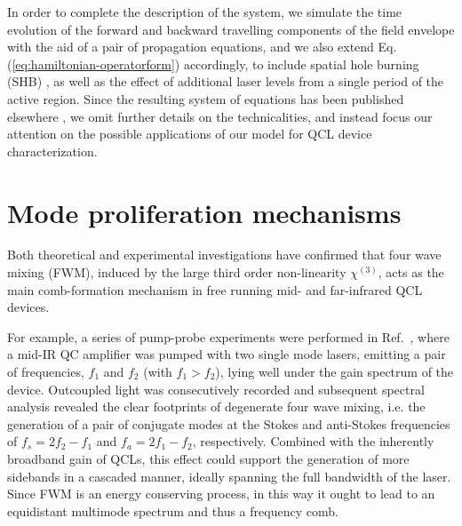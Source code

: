 \documentclass[journal]{IEEEtran}
\begin{document}
	
	In order to complete the description of the system, we simulate the time evolution of the forward and backward travelling components of the field envelope with the aid of a pair of propagation equations, and we also extend Eq. (\ref{eq:hamiltonian-operatorform}) accordingly,  to include  spatial hole burning (SHB) \cite{gordon2008multimode}, as well as the effect of additional laser levels from a single period of the active region. Since the resulting system of equations has been published elsewhere \cite{petz2016}, we omit further details on the technicalities, and instead focus our attention on the possible applications of our model for QCL device characterization. 
	
	\section{Mode proliferation mechanisms}
	\label{sec:proliferation}
	
	Both theoretical \cite{khurgin2014coherent} and experimental \cite{friedli2013four} investigations have confirmed that four wave mixing (FWM), induced by the large third order non-linearity $\chi^{(3)}$, acts as the main comb-formation mechanism in free running mid- and far-infrared QCL devices.
	
	For example, a series of pump-probe experiments were performed in Ref.~\cite{friedli2013four}, where a mid-IR QC amplifier was pumped with two single mode lasers, emitting a pair of frequencies, $f_1$ and $f_2$ (with $f_1 > f_2$), lying well under the gain spectrum of the device. Outcoupled light was consecutively recorded and subsequent spectral analysis revealed the clear footprints of degenerate four wave mixing, i.e. the generation of a pair of conjugate modes at the Stokes and anti-Stokes frequencies of  $f_s = 2f_2 -f_1 $ and $f_a = 2f_1 - f_2 $, respectively. Combined with the inherently broadband gain of QCLs, this effect could support the generation of more sidebands in a cascaded manner, ideally spanning the full bandwidth of the laser. Since FWM is an energy conserving process, in this way it ought to lead to an equidistant multimode spectrum and thus a frequency comb.
	
\end{document}
